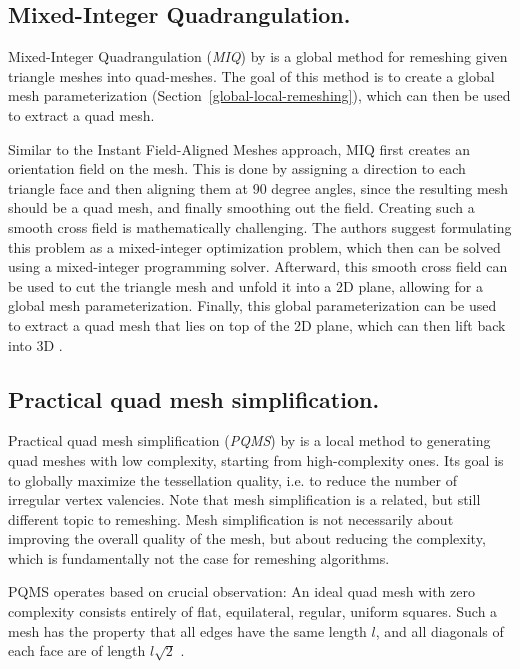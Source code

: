 \documentclass{ACGSeminar}
\begin{document}
\subsection*{Mixed-Integer Quadrangulation.}\label{MIQ}
Mixed-Integer Quadrangulation (\textit{MIQ}) by \cite{bommes2009mixed} is a global method for remeshing given triangle meshes into quad-meshes. The goal of this method is to create a global mesh parameterization (Section~\ref{global-local-remeshing}), which can then be used to extract a quad mesh.\bigskip

Similar to the Instant Field-Aligned Meshes approach, MIQ first creates an orientation field on the mesh. This is done by assigning a direction to each triangle face and then aligning them at 90 degree angles, since the resulting mesh should be a quad mesh, and finally smoothing out the field. Creating such a smooth cross field is mathematically challenging. The authors suggest formulating this problem as a mixed-integer optimization problem, which then can be solved using a mixed-integer programming solver. Afterward, this smooth cross field can be used to cut the triangle mesh and unfold it into a 2D plane, allowing for a global mesh parameterization. Finally, this global parameterization can be used to extract a quad mesh that lies on top of the 2D plane, which can then lift back into 3D \cite{bommes2009mixed,schmidt2014towards}.

\subsection*{Practical quad mesh simplification.}\label{PQMS}
Practical quad mesh simplification (\textit{PQMS}) by \cite{tarini2010practical} is a local method to generating quad meshes with low complexity, starting from high-complexity ones. Its goal is to globally maximize the tessellation quality, i.e. to reduce the number of irregular vertex valencies. Note that mesh simplification is a related, but still different topic to remeshing. Mesh simplification is not necessarily about improving the overall quality of the mesh, but about reducing the complexity, which is fundamentally not the case for remeshing algorithms.\bigskip

PQMS operates based on crucial observation: An ideal quad mesh with  zero complexity consists entirely of flat, equilateral, regular, uniform squares. Such a mesh has the property that all edges have the same length $l$, and all diagonals of each face are of length $l \sqrt{2}$ \cite{tarini2010practical}.
\end{document}
